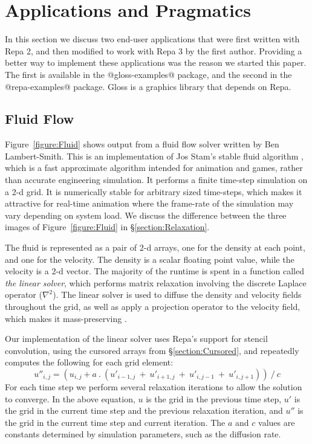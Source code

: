 
\clearpage{}
\section{Applications and Pragmatics}
\label{sec:performance}

In this section we discuss two end-user applications that were first written with Repa 2, and then modified to work with Repa 3 by the first author. Providing a better way to implement these applications was the reason we started this paper. The first is available in the @gloss-examples@ package, and the second in the @repa-examples@ package. Gloss is a graphics library that depends on Repa.


\subsection{Fluid Flow}
\label{section:FluidFlow}

Figure~\ref{figure:Fluid} shows output from a fluid flow solver written by Ben \mbox{Lambert-Smith}. This is an implementation of Jos Stam's stable fluid algorithm \cite{Stam:StableFluids}, which is a fast approximate algorithm intended for animation and games, rather than accurate engineering simulation. It performs a finite time-step simulation on a 2-d grid. It is numerically stable for arbitrary sized time-steps, which makes it attractive for real-time animation where the frame-rate of the simulation may vary depending on system load. We discuss the difference between the three images of Figure~\ref{figure:Fluid} in \S\ref{section:Relaxation}.

The fluid is represented as a pair of 2-d arrays, one for the density at each point, and one for the velocity. The density is a scalar floating point value, while the velocity is a 2-d vector. The majority of the runtime is spent in a function called \emph{the linear solver}, which performs matrix relaxation involving the discrete Laplace operator ($\nabla^2$). The linear solver is used to diffuse the density and velocity fields throughout the grid, as well as apply a projection operator to the velocity field, which makes it mass-preserving \cite{Stam:StableFluids}.

Our implementation of the linear solver uses Repa's support for stencil convolution, using the cursored arrays from \S\ref{section:Cursored}, and repeatedly computes the following for each grid element:
$$
u''_{i,j} = (u_{i,j} + a ~.~ (u'_{i-1,j} ~+~ u'_{i+1,j} ~+~ u'_{i,j-1} ~+~ u'_{i,j+1})) ~/~ c
$$
For each time step we perform several relaxation iterations to allow the solution to converge. In the above equation, $u$ is the grid in the previous time step, $u'$ is the grid in the current time step and the previous relaxation iteration, and $u''$ is the grid in the current time step and current iteration. The $a$ and $c$ values are constants determined by simulation parameters, such as the diffusion rate.

